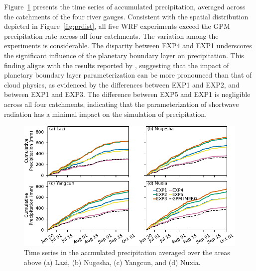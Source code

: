 \documentclass[draft]{agujournal2019}
\begin{document}
Figure~\ref{fig:prcumupts} presents the time series of accumulated precipitation, averaged across the catchments of the four river gauges. Consistent with the spatial distribution depicted in Figure~\ref{fig:prdist}, all five WRF experiments exceed the GPM precipitation rate across all four catchments. The variation among the experiments is considerable. The disparity between EXP4 and EXP1 underscores the significant influence of the planetary boundary layer on precipitation. This finding aligns with the results reported by , suggesting that the impact of planetary boundary layer parameterization can be more pronounced than that of cloud physics, as evidenced by the differences between EXP1 and EXP2, and between EXP1 and EXP3. The difference between EXP5 and EXP1 is negligible across all four catchments, indicating that the parameterization of shortwave radiation has a minimal impact on the simulation of precipitation.

\begin{figure}[h!]
  \centering
  \noindent\includegraphics[width=140mm]{prrn_prcumupts.pdf}
  \caption{Time series in the accmulated precipitation averaged over the areas above (a) Lazi, (b) Nugesha, (c) Yangcun, and (d) Nuxia. \label{fig:prcumupts}}
\end{figure}
\end{document}
